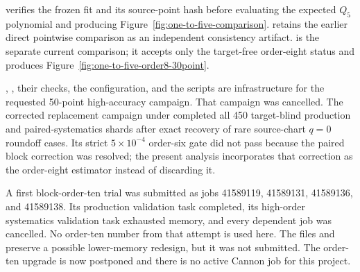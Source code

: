 \documentclass[11pt]{article}
\begin{document}
\begin{description}[style=nextline,leftmargin=3.8cm]
  \item[Later comparison]
   verifies the frozen
  fit and its source-point hash before evaluating the expected $Q_5$
  polynomial and producing Figure~\ref{fig:one-to-five-comparison}.
   retains the earlier direct
  pointwise comparison as an independent consistency artifact.
   is the separate
  current comparison; it accepts only the target-free order-eight status and
  produces Figure~\ref{fig:one-to-five-order8-30point}.

  \item[Cannon campaign]
  ,
  , their checks, the
   configuration,
  and the  scripts are
  infrastructure for the requested 50-point high-accuracy campaign.  That
  campaign was cancelled.  The corrected replacement campaign under
   completed all
  450 target-blind production and paired-systematics shards after exact
  recovery of rare source-chart $q=0$ roundoff cases.  Its strict
  $5\times10^{-4}$ order-six gate did not pass because the paired block
  correction was resolved; the present analysis incorporates that correction
  as the order-eight estimator instead of discarding it.

  A first block-order-ten trial was submitted as jobs 41589119, 41589131,
  41589136, and 41589138.  Its production validation task completed, its
  high-order systematics validation task exhausted memory, and every
  dependent job was cancelled.  No order-ten number from that attempt is
  used here.  The files
   and
   preserve
  a possible lower-memory redesign, but it was not submitted.  The
  order-ten upgrade is now postponed and there is no active Cannon job for
  this project.
\end{description}
\end{document}
